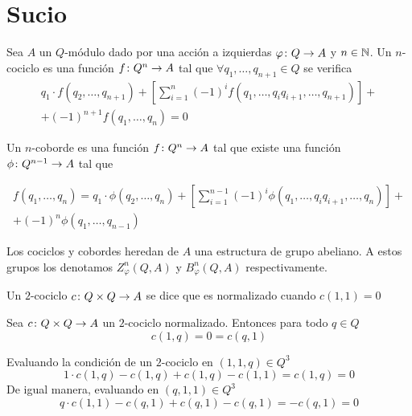 
\chapter{Sucio}


\begin{definicion}
	Sea $A$ un $Q$-módulo dado por una acción a izquierdas $\varphi\colon Q\to A$ y $n\in\mathbb{N}$. 
	Un $n$-cociclo es una función $f\colon Q^n\to A$ tal que $\forall q_1,\hdots,q_{n+1}\in Q$ se verifica
	\begin{multline*}
	 q_1\cdot f(q_2,\hdots,q_{n+1}) + \left[\sum\limits_{i=1}^{n} (-1)^i f(q_1,\hdots,q_iq_{i+1},\hdots,q_{n+1}) \right] + \\ + (-1)^{n+1}f(q_1,\hdots,q_n) = 0
	\end{multline*}
	
	Un $n$-coborde es una función $f\colon Q^n\to A$ tal que existe una función $\phi\colon Q^{n-1}\to A$ tal que
	
	\begin{multline*}
		f(q_1,\hdots, q_n) = q_1\cdot \phi(q_2,\hdots,q_n) + \left[\sum\limits_{i=1}^{n-1}(-1)^{i} \phi(q_1,\hdots,q_iq_{i+1},\hdots,q_n) \right] + \\ + (-1)^n\phi(q_1,\hdots,q_{n-1})
	\end{multline*} 
	
	Los cociclos y cobordes heredan de $A$ una estructura de grupo abeliano. A estos grupos los denotamos $Z^n_\varphi(Q,A)$ y $B^n_\varphi(Q,A)$ respectivamente.
\end{definicion}

\begin{definicion}
	Un $2$-cociclo $c\colon Q\times Q\to A$ se dice que es normalizado cuando $c(1,1)= 0$
\end{definicion}

\begin{proposicion}
	Sea $c\colon Q\times Q\to A$ un $2$-cociclo normalizado. Entonces para todo $q\in Q$
	\begin{equation*}
		c(1,q)=0=c(q,1)
	\end{equation*}
	\begin{demostracion}
		Evaluando la condición de un $2$-cociclo en $(1,1,q)\in Q^3$
		\begin{equation*}
			1\cdot c(1,q) - c(1,q) + c(1,q) - c(1,1) = c(1,q) =0
		\end{equation*} 
		De igual manera, evaluando en $(q,1,1)\in Q^3$
		\begin{equation*}
			q\cdot c(1,1) - c(q,1) + c(q,1) - c(q,1) = -c(q,1) = 0
		\end{equation*}
		
	\end{demostracion}
\end{proposicion}

